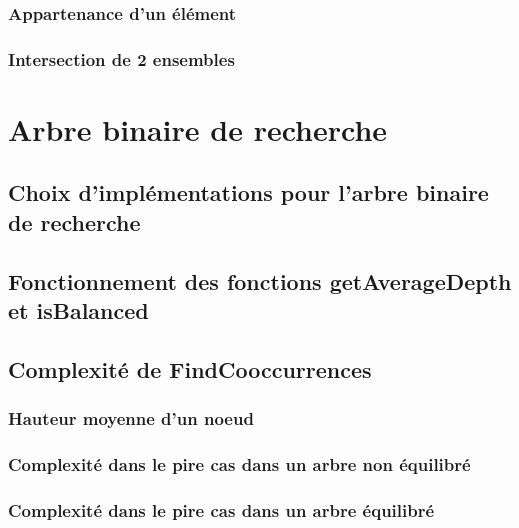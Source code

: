 \documentclass{article}
\begin{document}
        \subsubsection{Appartenance d'un élément}

        \subsubsection{Intersection de 2 ensembles}


\section{Arbre binaire de recherche}

    \subsection{Choix d'implémentations pour l'arbre binaire de recherche}

    \subsection{Fonctionnement des fonctions getAverageDepth et isBalanced}

    \subsection{Complexité de FindCooccurrences}

        \subsubsection{Hauteur moyenne d'un noeud}

        \subsubsection{Complexité dans le pire cas dans un arbre non équilibré}

        \subsubsection{Complexité dans le pire cas dans un arbre équilibré}
\end{document}
